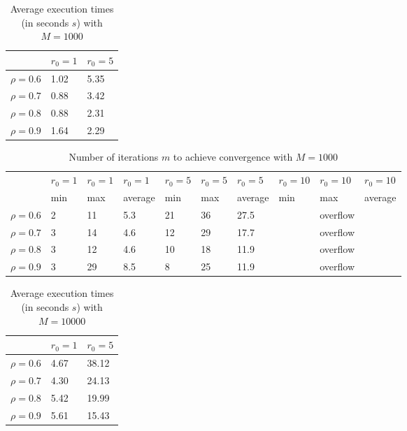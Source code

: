 \documentclass[a4paper,11pt,openright]{report}
\begin{document}
\begin{table}[H]
\centering
\addtolength{\leftskip}{-1.5cm}
\addtolength{\rightskip}{-1.5cm}
\begin{tabular}{|c|ll|}
\hline
$ $ & $r_0 = 1$ & $r_0 = 5$ \\
\hline
$\rho = 0.6$ & 1.02 & 5.35  \\

$\rho = 0.7$ & 0.88 & 3.42  \\

$\rho = 0.8$ & 0.88 & 2.31  \\

$\rho = 0.9$ & 1.64 & 2.29  \\
\hline
\end{tabular}
\caption{Average execution
 times (in seconds $s$) with $M = 1000$}
\end{table}
\begin{table}[H]
\centering
\addtolength{\leftskip}{-1.5cm}
\addtolength{\rightskip}{-1.5cm}
\begin{tabular}{|c|lllllllll|}
\hline
$ $ & $r_0 = 1$ & $r_0 = 1$ & $r_0 = 1$ & $r_0 = 5$ & $r_0 = 5$ & $r_0 = 5$ & $r_0 = 10$ & $r_0 = 10$ & $r_0 = 10$  \\
$ $ & min & max & average & min & max & average & min & max & average \\ 
\hline
$\rho = 0.6$ & 2 & 11 & 5.3 & 21 & 36 & 27.5 &  & overflow &  \\

$\rho = 0.7$ & 3 & 14 & 4.6 & 12 & 29 & 17.7 &  & overflow &  \\

$\rho = 0.8$ & 3 & 12 & 4.6 & 10 & 18 & 11.9 &  & overflow & \\

$\rho = 0.9$ & 3 & 29 & 8.5 & 8 & 25 & 11.9 &  & overflow & \\
\hline
\end{tabular}
\caption{Number of iterations $m$ to achieve convergence with $M = 1000$}
\end{table}
\begin{table}[H]
\centering
\addtolength{\leftskip}{-1.5cm}
\addtolength{\rightskip}{-1.5cm}
\begin{tabular}{|c|ll|}
\hline
$ $ & $r_0 = 1$ & $r_0 = 5$  \\
\hline
$\rho = 0.6$ & 4.67 & 38.12  \\

$\rho = 0.7$ & 4.30 & 24.13  \\

$\rho = 0.8$ & 5.42 & 19.99  \\

$\rho = 0.9$ & 5.61 & 15.43  \\
\hline
\end{tabular}
\caption{Average execution
 times (in seconds $s$) with $M = 10000$}
\end{table}
\end{document}
